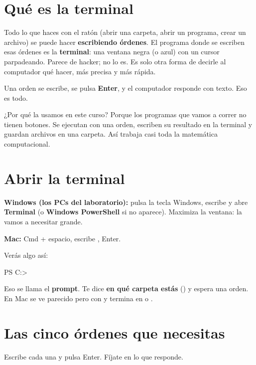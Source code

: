 
\newcommand{\docpie}{La terminal desde cero}


\section{Qué es la terminal}

Todo lo que haces con el ratón (abrir una carpeta, abrir un programa, crear un archivo) se puede hacer \textbf{escribiendo órdenes}. El programa donde se escriben esas órdenes es la \textbf{terminal}: una ventana negra (o azul) con un cursor parpadeando. Parece de hacker; no lo es. Es solo otra forma de decirle al computador qué hacer, más precisa y más rápida.

Una orden se escribe, se pulsa \textbf{Enter}, y el computador responde con texto. Eso es todo.

¿Por qué la usamos en este curso? Porque los programas que vamos a correr no tienen botones. Se ejecutan con una orden, escriben su resultado en la terminal y guardan archivos en una carpeta. Así trabaja casi toda la matemática computacional.

\section{Abrir la terminal}

\textbf{Windows (los PCs del laboratorio):} pulsa la tecla Windows, escribe  y abre \textbf{Terminal} (o \textbf{Windows PowerShell} si no aparece). Maximiza la ventana: la vamos a necesitar grande.

\textbf{Mac:} Cmd + espacio, escribe , Enter.

Verás algo así:
\begin{orden}
PS C:\Users\estudiante>
\end{orden}
Eso se llama el \textbf{prompt}. Te dice \textbf{en qué carpeta estás} () y espera una orden. En Mac se ve parecido pero con  y termina en \codigo{\%} o \codigo{\$}.

\section{Las cinco órdenes que necesitas}

Escribe cada una y pulsa Enter. Fíjate en lo que responde.

